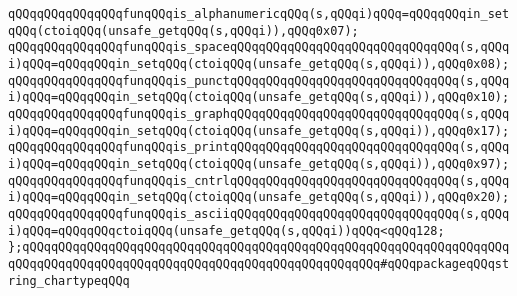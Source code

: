 \verb|qQQqqQQqqQQqqQQqfunqQQqis_alphanumericqQQq(s,qQQqi)qQQq=qQQqqQQqin_setqQQq(ctoiqQQq(unsafe_getqQQq(s,qQQqi)),qQQq0x07);|\newline
\verb|qQQqqQQqqQQqqQQqfunqQQqis_spaceqQQqqQQqqQQqqQQqqQQqqQQqqQQqqQQq(s,qQQqi)qQQq=qQQqqQQqin_setqQQq(ctoiqQQq(unsafe_getqQQq(s,qQQqi)),qQQq0x08);|\newline
\verb|qQQqqQQqqQQqqQQqfunqQQqis_punctqQQqqQQqqQQqqQQqqQQqqQQqqQQqqQQq(s,qQQqi)qQQq=qQQqqQQqin_setqQQq(ctoiqQQq(unsafe_getqQQq(s,qQQqi)),qQQq0x10);|\newline
\verb|qQQqqQQqqQQqqQQqfunqQQqis_graphqQQqqQQqqQQqqQQqqQQqqQQqqQQqqQQq(s,qQQqi)qQQq=qQQqqQQqin_setqQQq(ctoiqQQq(unsafe_getqQQq(s,qQQqi)),qQQq0x17);|\newline
\verb|qQQqqQQqqQQqqQQqfunqQQqis_printqQQqqQQqqQQqqQQqqQQqqQQqqQQqqQQq(s,qQQqi)qQQq=qQQqqQQqin_setqQQq(ctoiqQQq(unsafe_getqQQq(s,qQQqi)),qQQq0x97);|\newline
\verb|qQQqqQQqqQQqqQQqfunqQQqis_cntrlqQQqqQQqqQQqqQQqqQQqqQQqqQQqqQQq(s,qQQqi)qQQq=qQQqqQQqin_setqQQq(ctoiqQQq(unsafe_getqQQq(s,qQQqi)),qQQq0x20);|\newline
\newline
\verb|qQQqqQQqqQQqqQQqfunqQQqis_asciiqQQqqQQqqQQqqQQqqQQqqQQqqQQqqQQq(s,qQQqi)qQQq=qQQqqQQqctoiqQQq(unsafe_getqQQq(s,qQQqi))qQQq<qQQq128;|\newline
\newline
\newline
\verb|};qQQqqQQqqQQqqQQqqQQqqQQqqQQqqQQqqQQqqQQqqQQqqQQqqQQqqQQqqQQqqQQqqQQqqQQqqQQqqQQqqQQqqQQqqQQqqQQqqQQqqQQqqQQqqQQqqQQqqQQq#qQQqpackageqQQqstring_chartypeqQQq|\newline
\newline
\newline

